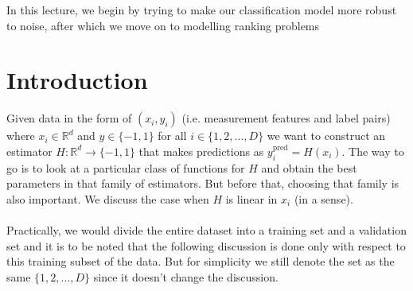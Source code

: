 \documentclass[12pt]{article}
\begin{document}
	\MakeScribeTop


In this lecture, we begin by trying to make our classification model more robust to noise, after which we move on to modelling ranking problems

\section{Introduction}

Given data in the form of $(x_i,y_i)$ (i.e. measurement features and label pairs) where $x_i\in \mathbb{R}^d$ and $ y\in\{-1,1\}$ for all $i\in\{1,2,\dots,D\}$ we want to construct an estimator $H: \mathbb{R}^d \rightarrow \{-1,1\}$ that makes predictions as $y^{\textrm{pred}}_i = H(x_i)$. The way to go is to look at a particular class of functions for $H$ and obtain the best parameters in that family of estimators. But before that, choosing that family is also important. We discuss the case when $H$ is linear in $x_i$ (in a sense). 
\\\\
Practically, we would divide the entire dataset into a training set and a validation set and it is to be noted that the following discussion is done only with respect to this training subset of the data. But for simplicity we still denote the set as the same $\{1,2,\dots,D\}$ since it doesn't change the discussion.
\end{document}
